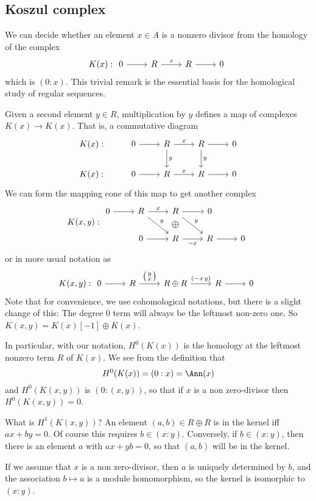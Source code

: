 \subsection{Koszul complex}
We can decide whether an element $x\in A$ is a nonzero divisor from the homology of the complex
\[K(x):\begin{tikzcd}
0\ar[r]&R\ar[r,"x"]&R\ar[r]&0
\end{tikzcd}\]
which is $(0:x)$. This trivial remark is the essential basis for the homological study of regular sequences.\par
Given a second element $y\in R$, multiplication by $y$ defines a map of complexes $K(x)\to K(x)$. That is, a commutative diagram
\[\begin{tikzcd}
K(x):&0\ar[r]&R\ar[d,"y"]\ar[r,"x"]&R\ar[d,"y"]\ar[r]&0\\
K(x):&0\ar[r]&R\ar[r,"x"]&R\ar[r]&0
\end{tikzcd}
\]
We can form the mapping cone of this map to get another complex
\[K(x,y):\begin{tikzcd}
0\ar[r]&R\ar[r,"x"]\ar[rd,"y"]&R\ar[draw=none]{d}[name=X, anchor=center,scale=1.5]{\oplus}\ar[r]\ar[rd,"y"]&0&\\
&0\ar[r]&R\ar[r,swap,"-x"]&R\ar[r]&0
\end{tikzcd}\]
or in more usual notation as
\[K(x,y):\begin{tikzcd}
0\ar[r]&R\ar[r,"\big(\begin{smallmatrix}y\\x
\end{smallmatrix}\big)"]&R\oplus R\ar[r,"(-x\,y)"]&R\ar[r]&0
\end{tikzcd}\]
Note that for convenience, we use cohomological notations, but there is a slight change of this: The degree $0$ term will always be the leftmost non-zero one. So $K(x,y)=K(x)[-1]\oplus K(x)$.\par 
In particular, with our notation, $H^0(K(x))$ is the homology at the leftmost nonzero term $R$ of $K(x)$. We see from the definition that \[H^0(K(x))=(0:x)=\Ann(x)\]
and $H^0(K(x,y))$ is $(0:(x, y))$, so that if $x$ is a non zero-divisor then $H^0(K(x,y))=0$.\par
What is $H^1(K(x,y))$? An element $(a,b)\in R\oplus R$ is in the kernel iff $ax+by=0$. Of course this requires $b\in(x:y)$. Conversely, if $b\in(x:y)$, then there is an element $a$ with $ax+yb=0$, so that $(a,b)$ will be in the kernel.\par
If we assume that $x$ is a non zero-divisor, then $a$ is uniquely determined by $b$, and the association $b\mapsto a$ is a module homomorphism, so the kernel is isomorphic to $(x:y)$.\par
